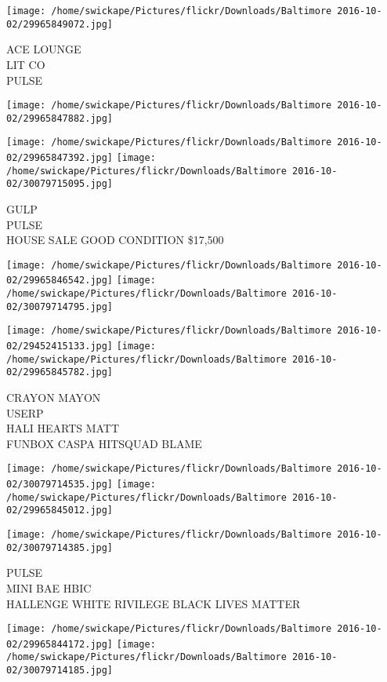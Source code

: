 \documentclass[10pt,letterpaper]{article}
\begin{document}
\texttt{[image: /home/swickape/Pictures/flickr/Downloads/Baltimore 2016-10-02/29965849072.jpg]}

ACE LOUNGE\\
LIT CO\\
PULSE
\pagebreak

\texttt{[image: /home/swickape/Pictures/flickr/Downloads/Baltimore 2016-10-02/29965847882.jpg]}

\vspace{0.25in}
\texttt{[image: /home/swickape/Pictures/flickr/Downloads/Baltimore 2016-10-02/29965847392.jpg]}
\texttt{[image: /home/swickape/Pictures/flickr/Downloads/Baltimore 2016-10-02/30079715095.jpg]}

GULP\\
PULSE\\
HOUSE SALE GOOD CONDITION \$17,500
\pagebreak

\texttt{[image: /home/swickape/Pictures/flickr/Downloads/Baltimore 2016-10-02/29965846542.jpg]}
\texttt{[image: /home/swickape/Pictures/flickr/Downloads/Baltimore 2016-10-02/30079714795.jpg]}

\texttt{[image: /home/swickape/Pictures/flickr/Downloads/Baltimore 2016-10-02/29452415133.jpg]}
\texttt{[image: /home/swickape/Pictures/flickr/Downloads/Baltimore 2016-10-02/29965845782.jpg]}

CRAYON MAYON\\
USERP\\
HALI HEARTS MATT\\
FUNBOX CASPA HITSQUAD BLAME
\pagebreak

\texttt{[image: /home/swickape/Pictures/flickr/Downloads/Baltimore 2016-10-02/30079714535.jpg]}
\texttt{[image: /home/swickape/Pictures/flickr/Downloads/Baltimore 2016-10-02/29965845012.jpg]}

\vspace{0.25in}
\texttt{[image: /home/swickape/Pictures/flickr/Downloads/Baltimore 2016-10-02/30079714385.jpg]}

PULSE\\
MINI BAE HBIC\\
HALLENGE WHITE RIVILEGE BLACK LIVES MATTER
\pagebreak

\texttt{[image: /home/swickape/Pictures/flickr/Downloads/Baltimore 2016-10-02/29965844172.jpg]}
\texttt{[image: /home/swickape/Pictures/flickr/Downloads/Baltimore 2016-10-02/30079714185.jpg]}
\end{document}
